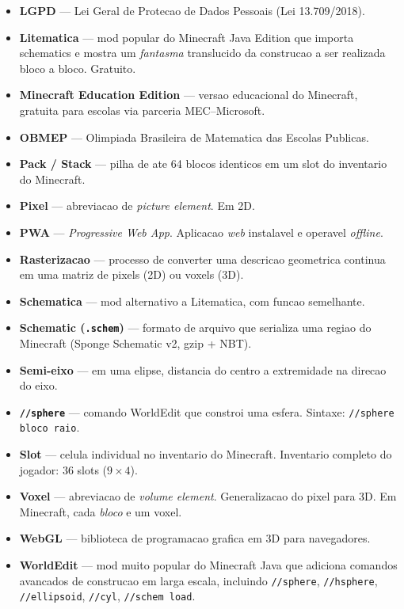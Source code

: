 \documentclass[12pt,a4paper]{scrartcl}
\newcommand{\code}[1]{\texttt{\small #1}}
\newcommand{\acc}[1]{\textcolor{accent}{\textbf{#1}}}
\newcommand{\cmd}[1]{\textcolor{earth}{\texttt{\small #1}}}
\begin{document}
\begin{itemize}[leftmargin=1.4em,itemsep=0.3em,topsep=0.3em]
  \item \acc{LGPD} --- Lei Geral de Protecao de Dados Pessoais (Lei 13.709/2018).
  \item \acc{Litematica} --- mod popular do Minecraft Java Edition que importa schematics e mostra um \emph{fantasma} translucido da construcao a ser realizada bloco a bloco. Gratuito.
  \item \acc{Minecraft Education Edition} --- versao educacional do Minecraft, gratuita para escolas via parceria MEC--Microsoft.
  \item \acc{OBMEP} --- Olimpiada Brasileira de Matematica das Escolas Publicas.
  \item \acc{Pack / Stack} --- pilha de ate 64 blocos identicos em um slot do inventario do Minecraft.
  \item \acc{Pixel} --- abreviacao de \emph{picture element}. Em 2D.
  \item \acc{PWA} --- \emph{Progressive Web App}. Aplicacao \emph{web} instalavel e operavel \emph{offline}.
  \item \acc{Rasterizacao} --- processo de converter uma descricao geometrica continua em uma matriz de pixels (2D) ou voxels (3D).
  \item \acc{Schematica} --- mod alternativo a Litematica, com funcao semelhante.
  \item \acc{Schematic (\texttt{.schem})} --- formato de arquivo que serializa uma regiao do Minecraft (Sponge Schematic v2, gzip + NBT).
  \item \acc{Semi-eixo} --- em uma elipse, distancia do centro a extremidade na direcao do eixo.
  \item \acc{\code{//sphere}} --- comando WorldEdit que constroi uma esfera. Sintaxe: \cmd{//sphere bloco raio}.
  \item \acc{Slot} --- celula individual no inventario do Minecraft. Inventario completo do jogador: 36 slots ($9 \times 4$).
  \item \acc{Voxel} --- abreviacao de \emph{volume element}. Generalizacao do pixel para 3D. Em Minecraft, cada \emph{bloco} e um voxel.
  \item \acc{WebGL} --- biblioteca de programacao grafica em 3D para navegadores.
  \item \acc{WorldEdit} --- mod muito popular do Minecraft Java que adiciona comandos avancados de construcao em larga escala, incluindo \cmd{//sphere}, \cmd{//hsphere}, \cmd{//ellipsoid}, \cmd{//cyl}, \cmd{//schem load}.
\end{itemize}
\end{document}
